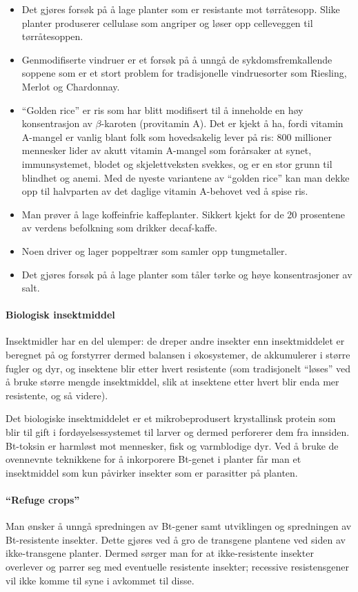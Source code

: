 \begin{itemize}[nolistsep,noitemsep]
	\item {}Det gjøres forsøk på å lage planter som er resistante mot tørråtesopp. Slike planter produserer cellulase som angriper og løser opp celleveggen til tørråtesoppen.
	\item {}Genmodifiserte vindruer er et forsøk på å unngå de sykdomsfremkallende soppene som er et stort problem for tradisjonelle vindruesorter som Riesling, Merlot og Chardonnay.
	\item {}``Golden rice'' er ris som har blitt modifisert til å inneholde en høy konsentrasjon av $\beta$-karoten (provitamin A). Det er kjekt å ha, fordi vitamin A-mangel er vanlig blant folk som hovedsakelig lever på ris: 800 millioner mennesker lider av akutt vitamin A-mangel som forårsaker at synet, immunsystemet, blodet og skjelettveksten svekkes, og er en stor grunn til blindhet og anemi. Med de nyeste variantene av ``golden rice'' kan man dekke opp til halvparten av det daglige vitamin A-behovet ved å spise ris.
	\item Man prøver å lage koffeinfrie kaffeplanter. Sikkert kjekt for de 20 prosentene av verdens befolkning som drikker decaf-kaffe.
	\item Noen driver og lager poppeltrær som samler opp tungmetaller.
	\item Det gjøres forsøk på å lage planter som tåler tørke og høye konsentrasjoner av salt.
\end{itemize}

\paragraph{Biologisk insektmiddel} Insektmidler har en del ulemper: de dreper andre insekter enn insektmiddelet er beregnet på og forstyrrer dermed balansen i økosystemer, de akkumulerer i større fugler og dyr, og insektene blir etter hvert resistente (som tradisjonelt ``løses'' ved å bruke større mengde insektmiddel, slik at insektene etter hvert blir enda mer resistente, og så videre). 

Det biologiske insektmiddelet  er et mikrobeprodusert krystallinsk protein som blir til gift i fordøyelsessystemet til larver og dermed perforerer dem fra innsiden. Bt-toksin er harmløst mot mennesker, fisk og varmblodige dyr. Ved å bruke de ovennevnte teknikkene for å inkorporere Bt-genet i planter får man et insektmiddel som kun påvirker insekter som er parasitter på planten.

\paragraph{``Refuge crops''} Man ønsker å unngå spredningen av Bt-gener samt utviklingen og spredningen av Bt-resistente insekter. Dette gjøres ved å gro de transgene plantene ved siden av ikke-transgene planter. Dermed sørger man for at ikke-resistente insekter overlever og parrer seg med eventuelle resistente insekter; recessive resistensgener vil ikke komme til syne i avkommet til disse.

